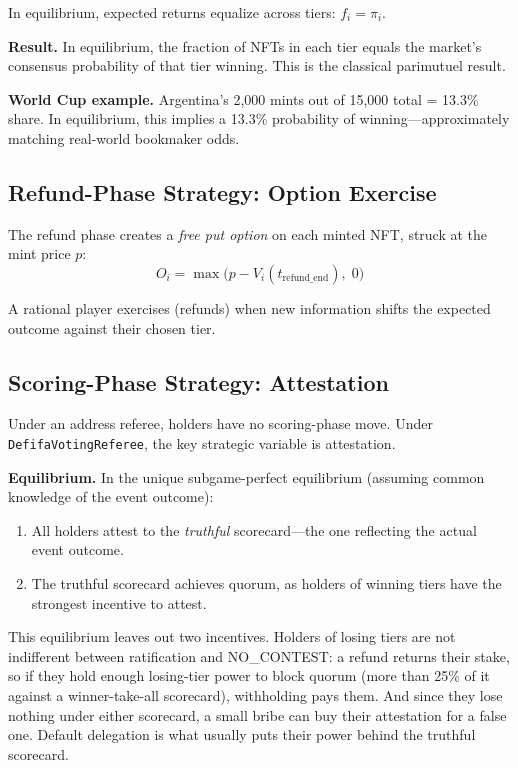 \documentclass[11pt,a4paper]{article}
\begin{document}
In equilibrium, expected returns equalize across tiers: $f_i = \pi_i$.

\textbf{Result.} In equilibrium, the fraction of NFTs in each tier equals the market's consensus probability of that tier winning. This is the classical parimutuel result.

\textbf{World Cup example.} Argentina's 2,000 mints out of 15,000 total = 13.3\% share. In equilibrium, this implies a 13.3\% probability of winning---approximately matching real-world bookmaker odds.

\subsection{Refund-Phase Strategy: Option Exercise}

The refund phase creates a \emph{free put option} on each minted NFT, struck at the mint price $p$:
\begin{equation}
O_i = \max\bigl(p - V_i(t_{\text{refund\_end}}),\; 0\bigr)
\end{equation}

A rational player exercises (refunds) when new information shifts the expected outcome against their chosen tier.

\subsection{Scoring-Phase Strategy: Attestation}

Under an address referee, holders have no scoring-phase move. Under \texttt{DefifaVotingReferee}, the key strategic variable is attestation.

\textbf{Equilibrium.} In the unique subgame-perfect equilibrium (assuming common knowledge of the event outcome):
\begin{enumerate}[nosep]
    \item All holders attest to the \emph{truthful} scorecard---the one reflecting the actual event outcome.
    \item The truthful scorecard achieves quorum, as holders of winning tiers have the strongest incentive to attest.
\end{enumerate}

This equilibrium leaves out two incentives. Holders of losing tiers are not indifferent between ratification and NO\_CONTEST: a refund returns their stake, so if they hold enough losing-tier power to block quorum (more than 25\% of it against a winner-take-all scorecard), withholding pays them. And since they lose nothing under either scorecard, a small bribe can buy their attestation for a false one. Default delegation is what usually puts their power behind the truthful scorecard.
\end{document}
